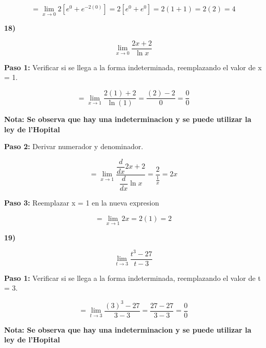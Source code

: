 \documentclass[12pt,a4paper]{article}
\begin{document}
\[
= \lim_{x \to 0} 2[e^{0}+e^{-2(0)}]= 2[e^{0}+e^{0}]= 2(1+1)= 2(2)= 4
\]


\vspace{0.2cm}
\newpage


\textbf{18)}

\[
\lim_{x \to 0} \frac{2x+2}{\ln x} 
\]

\vspace{0.2cm}

\textbf{Paso 1:}
\vspace{0.2cm}
Verificar si se llega a la forma indeterminada, reemplazando el valor de x = 1.

\[
= \lim_{x \to 1} \frac{2(1)+2}{\ln (1)}= \frac{(2)-2}{0}= \frac{0}{0}
\]

\vspace{0.2cm}

\textbf{Nota: Se observa que hay una indeterminacion y se puede utilizar la ley de l'Hopital }

\vspace{0.5cm}

\textbf{Paso 2:}
\vspace{0.2cm}
Derivar numerador y denominador.

\[
= \lim_{x \to 1} \frac{\dfrac{d}{dx} 2x+2}{\dfrac{d}{dx} \ln x}= \frac{2}{\frac{1}{x}}= 2x
\]

\vspace{0.2cm}



\textbf{Paso 3:}
\vspace{0.2cm}
Reemplazar x = 1 en la nueva expresion

\[
= \lim_{x \to 1} 2x= 2(1) = 2
\]


\textbf{19)}

\[
\lim_{t \to 3} \frac{t^3 - 27}{t-3} 
\]

\vspace{0.2cm}

\textbf{Paso 1:}
\vspace{0.2cm}
Verificar si se llega a la forma indeterminada, reemplazando el valor de t = 3.

\[
= \lim_{t \to 3} \frac{(3)^3 - 27}{3-3}= \frac{27-27}{3-3}= \frac{0}{0}
\]


\vspace{0.2cm}

\textbf{Nota: Se observa que hay una indeterminacion y se puede utilizar la ley de l'Hopital }
\end{document}
